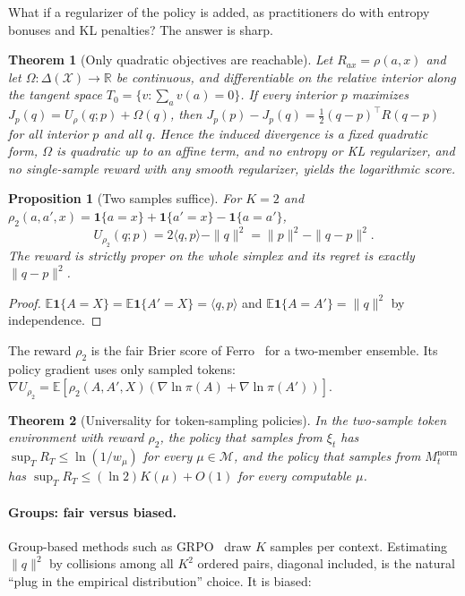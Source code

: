 \documentclass[11pt]{article}
\newtheorem{theorem}{Theorem}
\newtheorem{proposition}{Proposition}
\theoremstyle{definition}
\newcommand{\X}{\mathcal{X}}
\newcommand{\Del}{\Delta(\X)}
\newcommand{\E}{\mathbb{E}}
\newcommand{\R}{\mathbb{R}}
\newcommand{\one}{\mathbf{1}}
\begin{document}
\noindent What if a regularizer of the policy is added, as practitioners do with entropy bonuses and KL penalties? The answer is sharp.

\begin{theorem}[Only quadratic objectives are reachable]\label{thm:quadratic}
Let $R_{ax}=\rho(a,x)$ and let $\Omega:\Del\to\R$ be continuous, and differentiable on the relative interior along the tangent space $T_0=\{v:\sum_av(a)=0\}$. If every interior $p$ maximizes $J_p(q)=U_\rho(q;p)+\Omega(q)$, then $J_p(p)-J_p(q)=\frac12(q-p)^\top R(q-p)$ for all interior $p$ and all $q$. Hence the induced divergence is a fixed quadratic form, $\Omega$ is quadratic up to an affine term, and no entropy or KL regularizer, and no single-sample reward with any smooth regularizer, yields the logarithmic score.
\end{theorem}

\begin{proposition}[Two samples suffice]\label{prop:two}
For $K=2$ and $\rho_2(a,a',x)=\one\{a=x\}+\one\{a'=x\}-\one\{a=a'\}$,
\[U_{\rho_2}(q;p)=2\langle q,p\rangle-\|q\|^2=\|p\|^2-\|q-p\|^2 .\]
The reward is strictly proper on the whole simplex and its regret is exactly $\|q-p\|^2$.
\end{proposition}
\begin{proof}
$\E\one\{A=X\}=\E\one\{A'=X\}=\langle q,p\rangle$ and $\E\one\{A=A'\}=\|q\|^2$ by independence.
\end{proof}

\noindent The reward $\rho_2$ is the fair Brier score of Ferro~\cite{ferro2014fair} for a two-member ensemble. Its policy gradient uses only sampled tokens: $\nabla U_{\rho_2}=\E[\rho_2(A,A',X)(\nabla\ln\pi(A)+\nabla\ln\pi(A'))]$.

\begin{theorem}[Universality for token-sampling policies]\label{thm:token}
In the two-sample token environment with reward $\rho_2$, the policy that samples from $\xi_t$ has $\sup_TR_T\le\ln(1/w_\mu)$ for every $\mu\in\mathcal M$, and the policy that samples from $M^{\mathrm{norm}}_t$ has $\sup_TR_T\le(\ln2)K(\mu)+O(1)$ for every computable $\mu$.
\end{theorem}

\paragraph{Groups: fair versus biased.} Group-based methods such as GRPO~\cite{shao2024deepseekmath} draw $K$ samples per context. Estimating $\|q\|^2$ by collisions among all $K^2$ ordered pairs, diagonal included, is the natural ``plug in the empirical distribution'' choice. It is biased:
\end{document}
